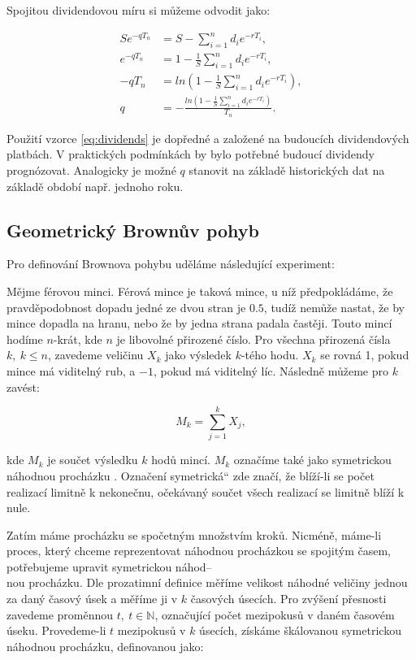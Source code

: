 \documentclass[male,czech,api_bc]{kitheses}
\newcommand{\UV}[1]{\quotedblbase#1\textquotedblleft}
\begin{document}
  Spojitou dividendovou míru si můžeme odvodit jako:

  \begin{align}
    S e^{-qT_n} &= S - \sum_{i = 1}^{n} d_i e^{-r T_i}, \\
      e^{-qT_n} &= 1 - \frac{1}{S} \sum_{i = 1}^{n} d_i e^{-r T_i}, \\
          -qT_n &= ln(1 - \frac{1}{S} \sum_{i = 1}^{n} d_i e^{-r T_i}), \\
          q &= - \frac{ln(1 - \frac{1}{S} \sum_{i = 1}^{n} d_i e^{-r T_i})}{T_n}. \label{eq:dividends}
  \end{align}

  Použití vzorce \eqref{eq:dividends} je dopředné a založené na budoucích dividendových platbách. V praktických podmínkách by bylo potřebné budoucí dividendy prognózovat. Analogicky je možné $q$ stanovit na základě historických dat na základě období např. jednoho roku.

  \subsection{Geometrický Brownův pohyb}

  \label{sec:gbm}
  Pro definování Brownova pohybu uděláme následující experiment:

  Mějme férovou minci. Férová mince je taková mince, u níž předpokládáme, že pravděpodobnost dopadu jedné ze dvou stran je $0.5$, tudíž nemůže nastat, že by mince dopadla na hranu, nebo že by jedna strana padala častěji. Touto mincí hodíme $n$-krát, kde $n$ je libovolné přirozené číslo. Pro všechna přirozená čísla $k,\ k \le n$, zavedeme veličinu $X_k$ jako výsledek $k$-tého hodu. $X_k$ se rovná 1, pokud mince má viditelný rub, a $-1$, pokud má viditelný líc. Následně můžeme pro $k$ zavést:

  \begin{equation}
    \label{eq:random_sym_walk}
    M_k = \sum \limits^k_{j=1} X_j,
  \end{equation}

  kde $M_k$ je součet výsledku $k$ hodů mincí. $M_k$ označíme také jako symetrickou náhodnou procházku \parencites[kapitola~3.2.1]{Shreve2004}. Označení \UV{symetrická} zde značí, že blíží-li se počet realizací limitně k nekonečnu, očekávaný součet všech realizací se limitně blíží k nule. 

  Zatím máme procházku se spočetným množstvím kroků. Nicméně, máme-li proces, který chceme reprezentovat náhodnou procházkou se spojitým časem, potřebujeme upravit symetrickou náhod--\\nou procházku. Dle prozatimní definice měříme velikost náhodné veličiny jednou za daný časový úsek a měříme ji v $k$ časových úsecích. Pro zvýšení přesnosti zavedeme proměnnou $t,\ t \in \mathbb{N}$, označující počet mezipokusů v daném časovém úseku. Provedeme-li $t$ mezipokusů v $k$ úsecích, získáme škálovanou symetrickou náhodnou procházku, definovanou jako:
\end{document}
